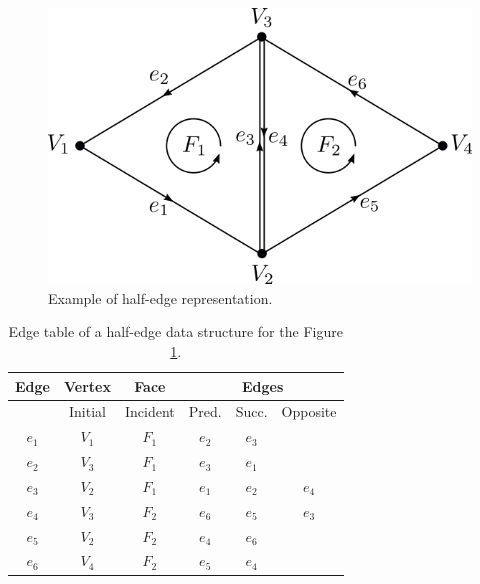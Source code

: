 \begin{figure}
    \centerline{\includegraphics[scale=0.5]{images/img31}}
    \caption[Example of half-edge representation]
    {Example of half-edge representation.}
    \label{img:31}
\end{figure}

\begin{table}[]\centering
    \begin{tabular}{|c|c|c|ccc|}
    \hline
    \hline
    Edge  & Vertex       & Face        & \multicolumn{3}{c|}{Edges}                            \\ \hline
          & Initial      & Incident    & Pred.            & Succ.           & Opposite         \\ \hline\hline
    $e_1$ & $V_1$        & $F_1$       & $e_2$            & $e_3$           &                  \\ \hline
    $e_2$ & $V_3$        & $F_1$       & $e_3$            & $e_1$           &                  \\ \hline
    $e_3$ & $V_2$        & $F_1$       & $e_1$            & $e_2$           & $e_4$            \\ \hline
    $e_4$ & $V_3$        & $F_2$       & $e_6$            & $e_5$           & $e_3$            \\ \hline
    $e_5$ & $V_2$        & $F_2$       & $e_4$            & $e_6$           &                  \\ \hline
    $e_6$ & $V_4$        & $F_2$       & $e_5$            & $e_4$           &                  \\ \hline\hline
    
    \end{tabular}
\caption{Edge table of a half-edge data structure for the Figure \ref{img:31}.}
\label{tab:5}
\end{table}

